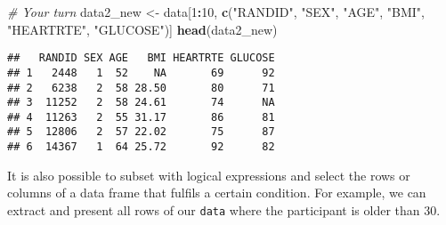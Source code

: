 \documentclass[
]{article}
\newenvironment{Shaded}{\begin{snugshade}}{\end{snugshade}}
\newcommand{\CommentTok}[1]{\textcolor[rgb]{0.56,0.35,0.01}{\textit{#1}}}
\newcommand{\DecValTok}[1]{\textcolor[rgb]{0.00,0.00,0.81}{#1}}
\newcommand{\KeywordTok}[1]{\textcolor[rgb]{0.13,0.29,0.53}{\textbf{#1}}}
\newcommand{\NormalTok}[1]{#1}
\newcommand{\OperatorTok}[1]{\textcolor[rgb]{0.81,0.36,0.00}{\textbf{#1}}}
\newcommand{\StringTok}[1]{\textcolor[rgb]{0.31,0.60,0.02}{#1}}
\begin{document}
\begin{Shaded}
\begin{Highlighting}[]
\CommentTok{# Your turn}
\NormalTok{data2_new <-}\StringTok{ }\NormalTok{data[}\DecValTok{1}\OperatorTok{:}\DecValTok{10}\NormalTok{, }
                  \KeywordTok{c}\NormalTok{(}\StringTok{"RANDID"}\NormalTok{, }\StringTok{"SEX"}\NormalTok{, }\StringTok{"AGE"}\NormalTok{, }\StringTok{"BMI"}\NormalTok{, }
                    \StringTok{"HEARTRTE"}\NormalTok{, }\StringTok{"GLUCOSE"}\NormalTok{)]}
\KeywordTok{head}\NormalTok{(data2_new)}
\end{Highlighting}
\end{Shaded}

\begin{verbatim}
##   RANDID SEX AGE   BMI HEARTRTE GLUCOSE
## 1   2448   1  52    NA       69      92
## 2   6238   2  58 28.50       80      71
## 3  11252   2  58 24.61       74      NA
## 4  11263   2  55 31.17       86      81
## 5  12806   2  57 22.02       75      87
## 6  14367   1  64 25.72       92      82
\end{verbatim}

It is also possible to subset with logical expressions and select the
rows or columns of a data frame that fulfils a certain condition. For
example, we can extract and present all rows of our \texttt{data} where
the participant is older than 30.

\begin{Shaded}
\end{Shaded}
\end{document}
